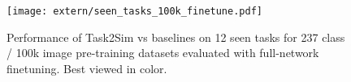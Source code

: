 \begin{figure}[h]
    \centering
    \texttt{[image: extern/seen\_tasks\_100k\_finetune.pdf]}
    \vspace{-2mm}
    \caption{Performance of Task2Sim vs baselines on 12 seen tasks for 237 class / 100k image pre-training datasets evaluated with full-network finetuning. Best viewed in color.}
    \label{fig:main_all_seen}
   \vspace{-3mm}
\end{figure}